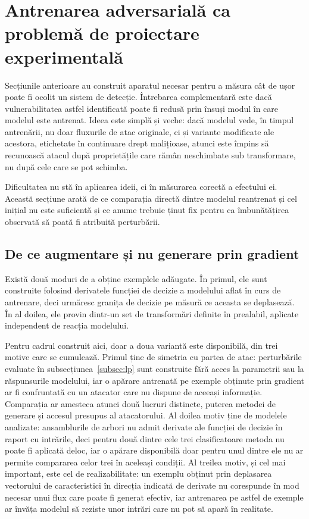\section{Antrenarea adversarială ca problemă de proiectare experimentală}\label{sec:antrenare}

Secțiunile anterioare au construit aparatul necesar pentru a măsura cât de ușor poate fi ocolit un sistem de detecție. Întrebarea complementară este dacă vulnerabilitatea astfel identificată poate fi redusă prin însuși modul în care modelul este antrenat. Ideea este simplă și veche: dacă modelul vede, în timpul antrenării, nu doar fluxurile de atac originale, ci și variante modificate ale acestora, etichetate în continuare drept malițioase, atunci este împins să recunoască atacul după proprietățile care rămân neschimbate sub transformare, nu după cele care se pot schimba.

Dificultatea nu stă în aplicarea ideii, ci în măsurarea corectă a efectului ei. Această secțiune arată de ce comparația directă dintre modelul reantrenat și cel inițial nu este suficientă și ce anume trebuie ținut fix pentru ca îmbunătățirea observată să poată fi atribuită perturbării.

\subsection{De ce augmentare și nu generare prin gradient}\label{subsec:de-ce-augmentare}

Există două moduri de a obține exemplele adăugate. În primul, ele sunt construite folosind derivatele funcției de decizie a modelului aflat în curs de antrenare, deci urmăresc granița de decizie pe măsură ce aceasta se deplasează. În al doilea, ele provin dintr-un set de transformări definite în prealabil, aplicate independent de reacția modelului.

Pentru cadrul construit aici, doar a doua variantă este disponibilă, din trei motive care se cumulează. Primul ține de simetria cu partea de atac: perturbările evaluate în subsecțiunea~\ref{subsec:lp} sunt construite fără acces la parametrii sau la răspunsurile modelului, iar o apărare antrenată pe exemple obținute prin gradient ar fi confruntată cu un atacator care nu dispune de aceeași informație. Comparația ar amesteca atunci două lucruri distincte, puterea metodei de generare și accesul presupus al atacatorului. Al doilea motiv ține de modelele analizate: ansamblurile de arbori nu admit derivate ale funcției de decizie în raport cu intrările, deci pentru două dintre cele trei clasificatoare metoda nu poate fi aplicată deloc, iar o apărare disponibilă doar pentru unul dintre ele nu ar permite compararea celor trei în aceleași condiții. Al treilea motiv, și cel mai important, este cel de realizabilitate: un exemplu obținut prin deplasarea vectorului de caracteristici în direcția indicată de derivate nu corespunde în mod necesar unui flux care poate fi generat efectiv, iar antrenarea pe astfel de exemple ar învăța modelul să reziste unor intrări care nu pot să apară în realitate.


